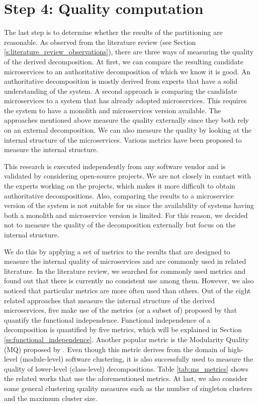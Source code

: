 \section{Step 4: Quality computation}\label{s:quality_computation}
The last step is to determine whether the results of the partitioning are reasonable. As observed from the literature review (see Section \ref{s:literature_review_observations}), there are three ways of measuring the quality of the derived decomposition. At first, we can compare the resulting candidate microservices to an authoritative decomposition of which we know it is good. An authoritative decomposition is mostly derived from experts that have a solid understanding of the system. A second approach is comparing the candidate microservices to a system that has already adopted microservices. This requires the system to have a monolith and microservices version available. The approaches mentioned above measure the quality externally since they both rely on an external decomposition. We can also measure the quality by looking at the internal structure of the microservices. Various metrics have been proposed to measure the internal structure. \par
This research is executed independently from any software vendor and is validated by considering open-source projects. We are not closely in contact with the experts working on the projects, which makes it more difficult to obtain authoritative decompositions. Also, comparing the results to a microservice version of the system is not suitable for us since the availability of systems having both a monolith and microservice version is limited. For this reason, we decided not to measure the quality of the decomposition externally but focus on the internal structure. \par
We do this by applying a set of metrics to the results that are designed to measure the internal quality of microservices and are commonly used in related literature. In the literature review, we searched for commonly used metrics and found out that there is currently no consistent use among them. However, we also noticed that particular metrics are more often used than others. Out of the eight related approaches that measure the internal structure of the derived microservices, five make use of the metrics (or a subset of) proposed by \citeauthor{jin2018functionality} \cite{jin2018functionality} that quantify the functional independence. Functional independence of a decomposition is quantified by five metrics, which will be explained in Section \ref{ss:functional_independence}. Another popular metric is the Modularity Quality (MQ) proposed by \citeauthor{mancoridis1998using} \cite{mancoridis1998using}. Even though this metric derives from the domain of high-level (module-level) software clustering, it is also successfully used to measure the quality of lower-level (class-level) decompositions. Table \ref{tab:ms_metrics} shows the related works that use the aforementioned metrics. At last, we also consider some general clustering quality measures such as the number of singleton clusters and the maximum cluster size. \par

